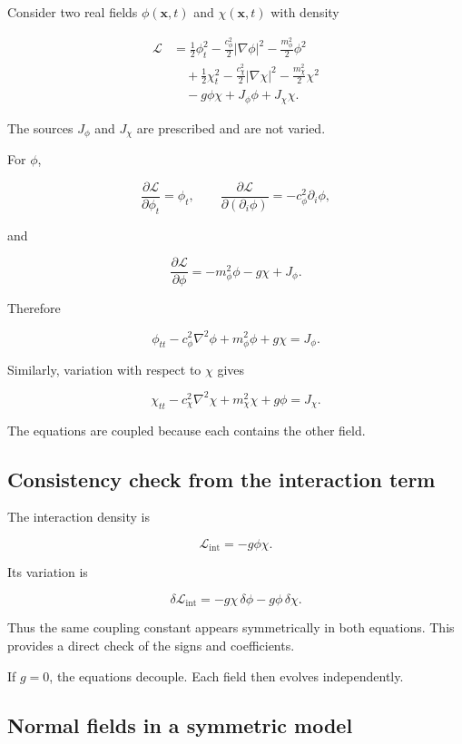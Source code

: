 Consider two real fields \(\phi(\mathbf{x},t)\) and \(\chi(\mathbf{x},t)\) with density

\[
\begin{aligned}
\mathcal{L}
&=
\frac{1}{2}\phi_{t}^{2}
-
\frac{c_{\phi}^{2}}{2}|\nabla\phi|^{2}
-
\frac{m_{\phi}^{2}}{2}\phi^{2}\\
&\quad+
\frac{1}{2}\chi_{t}^{2}
-
\frac{c_{\chi}^{2}}{2}|\nabla\chi|^{2}
-
\frac{m_{\chi}^{2}}{2}\chi^{2}\\
&\quad-
g\phi\chi
+
J_{\phi}\phi
+
J_{\chi}\chi.
\end{aligned}
\]

The sources \(J_{\phi}\) and \(J_{\chi}\) are prescribed and are not varied.

For \(\phi\),

\[
\frac{\partial\mathcal{L}}
{\partial\phi_{t}}
=
\phi_{t},
\qquad
\frac{\partial\mathcal{L}}
{\partial(\partial_{i}\phi)}
=
-c_{\phi}^{2}\partial_{i}\phi,
\]

and

\[
\frac{\partial\mathcal{L}}{\partial\phi}
=
-m_{\phi}^{2}\phi-g\chi+J_{\phi}.
\]

Therefore

\[
\boxed{
\phi_{tt}
-
c_{\phi}^{2}\nabla^{2}\phi
+
m_{\phi}^{2}\phi
+
g\chi
=
J_{\phi}
}.
\]

Similarly, variation with respect to \(\chi\) gives

\[
\boxed{
\chi_{tt}
-
c_{\chi}^{2}\nabla^{2}\chi
+
m_{\chi}^{2}\chi
+
g\phi
=
J_{\chi}
}.
\]

The equations are coupled because each contains the other field.

\subsection{Consistency check from the interaction term}

The interaction density is

\[
\mathcal{L}_{\mathrm{int}}
=
-g\phi\chi.
\]

Its variation is

\[
\delta\mathcal{L}_{\mathrm{int}}
=
-g\chi\,\delta\phi
-
g\phi\,\delta\chi.
\]

Thus the same coupling constant appears symmetrically in both equations. This provides a direct check of the signs and coefficients.

If \(g=0\), the equations decouple. Each field then evolves independently.

\subsection{Normal fields in a symmetric model}

